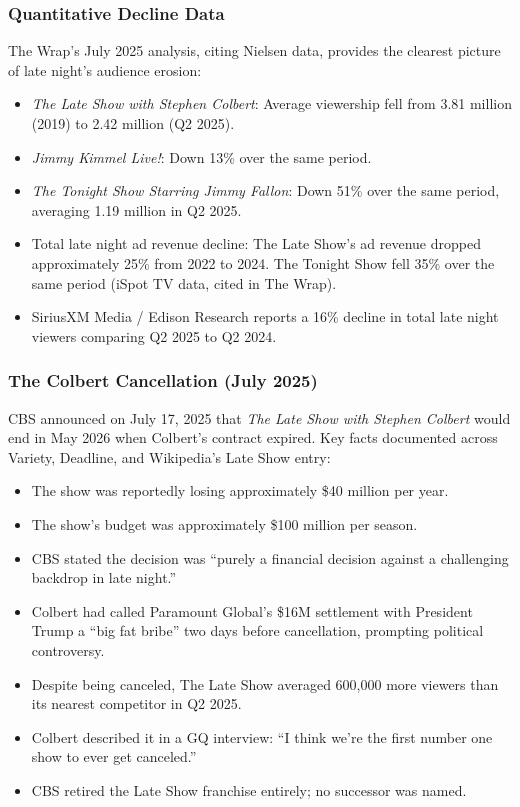 \documentclass[11pt,letterpaper]{article}
\begin{document}
\subsubsection{Quantitative Decline Data}
The Wrap's July 2025 analysis, citing Nielsen data, provides the clearest picture of late night's audience erosion:
\begin{itemize}[leftmargin=1.5em]
  \item \textit{The Late Show with Stephen Colbert}: Average viewership fell from 3.81 million (2019) to 2.42 million (Q2 2025).
  \item \textit{Jimmy Kimmel Live!}: Down 13\% over the same period.
  \item \textit{The Tonight Show Starring Jimmy Fallon}: Down 51\% over the same period, averaging 1.19 million in Q2 2025.
  \item Total late night ad revenue decline: The Late Show's ad revenue dropped approximately 25\% from 2022 to 2024. The Tonight Show fell 35\% over the same period (iSpot TV data, cited in The Wrap).
  \item SiriusXM Media / Edison Research reports a 16\% decline in total late night viewers comparing Q2 2025 to Q2 2024.
\end{itemize}

\subsubsection{The Colbert Cancellation (July 2025)}
CBS announced on July 17, 2025 that \textit{The Late Show with Stephen Colbert} would end in May 2026 when Colbert's contract expired. Key facts documented across Variety, Deadline, and Wikipedia's Late Show entry:
\begin{itemize}[leftmargin=1.5em]
  \item The show was reportedly losing approximately \$40 million per year.
  \item The show's budget was approximately \$100 million per season.
  \item CBS stated the decision was ``purely a financial decision against a challenging backdrop in late night.''
  \item Colbert had called Paramount Global's \$16M settlement with President Trump a ``big fat bribe'' two days before cancellation, prompting political controversy.
  \item Despite being canceled, The Late Show averaged 600,000 more viewers than its nearest competitor in Q2 2025.
  \item Colbert described it in a GQ interview: ``I think we're the first number one show to ever get canceled.''
  \item CBS retired the Late Show franchise entirely; no successor was named.
\end{itemize}
\end{document}
